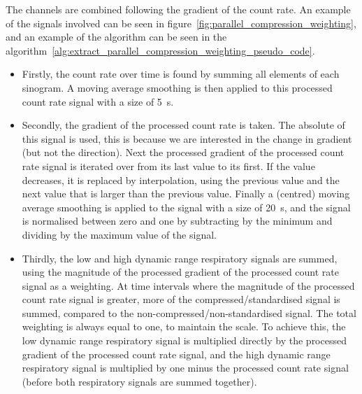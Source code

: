         The channels are combined following the gradient of the count rate. An example of the signals involved can be seen in figure~\ref{fig:parallel_compression_weighting}, and an example of the algorithm can be seen in the algorithm~\ref{alg:extract_parallel_compression_weighting_pseudo_code}.

        \begin{itemize}
            \item Firstly, the count rate over time is found by summing all elements of each sinogram. A moving average smoothing is then applied to this processed count rate signal with a size of \SI{5}{\second}.
            
            \item Secondly, the gradient of the processed count rate is taken. The absolute of this signal is used, this is because we are interested in the change in gradient (but not the direction). Next the processed gradient of the processed count rate signal is iterated over from its last value to its first. If the value decreases, it is replaced by interpolation, using the previous value and the next value that is larger than the previous value. Finally a (centred) moving average smoothing is applied to the signal with a size of \SI{20}{\second}, and the signal is normalised between zero and one by subtracting by the minimum and dividing by the maximum value of the signal.
            
            \item Thirdly, the low and high dynamic range respiratory signals are summed, using the magnitude of the processed gradient of the processed count rate signal as a weighting. At time intervals where the magnitude of the processed count rate signal is greater, more of the compressed/standardised signal is summed, compared to the non-compressed/non-standardised signal. The total weighting is always equal to one, to maintain the scale. To achieve this, the low dynamic range respiratory signal is multiplied directly by the processed gradient of the processed count rate signal, and the high dynamic range respiratory signal is multiplied by one minus the processed count rate signal (before both respiratory signals are summed together).
        \end{itemize}